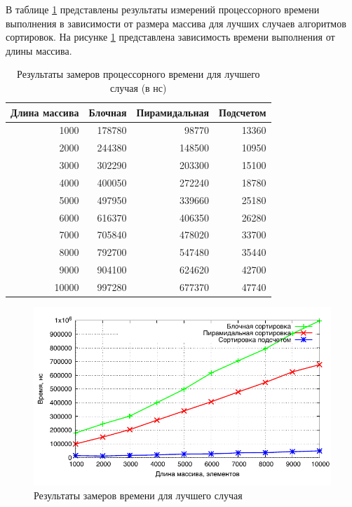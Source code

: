 В таблице \ref{table:time_best} представлены результаты измерений процессорного времени выполнения в зависимости от размера массива для лучших случаев алгоритмов сортировок. На рисунке \ref{img:time_best} представлена зависимость времени выполнения от длины массива.

\begin{table}[h]
  \caption{\label{table:time_best} Результаты замеров процессорного времени для лучшего случая (в нс)}
  \begin{center}
    \begin{tabular}{|r|r|r|r|}
      \hline
      Длина массива & Блочная & Пирамидальная & Подсчетом\\ \hline
1000 & 178780 & 98770 & 13360 \\ \hline 
2000 & 244380 & 148500 & 10950 \\ \hline 
3000 & 302290 & 203300 & 15100 \\ \hline 
4000 & 400050 & 272240 & 18780 \\ \hline 
5000 & 497950 & 339660 & 25180 \\ \hline 
6000 & 616370 & 406350 & 26280 \\ \hline 
7000 & 705840 & 478020 & 33700 \\ \hline 
8000 & 792700 & 547480 & 35440 \\ \hline 
9000 & 904100 & 624620 & 42700 \\ \hline 
10000 & 997280 & 677370 & 47740 \\ \hline 



    \end{tabular}
  \end{center}
\end{table}

\newpage

\noindent
\begin{figure}[h!]
	\centering
    \includegraphics[width=0.75\linewidth]{../data/time_best}
    \caption{Результаты замеров времени для лучшего случая}
    \label{img:time_best}
\end{figure}

